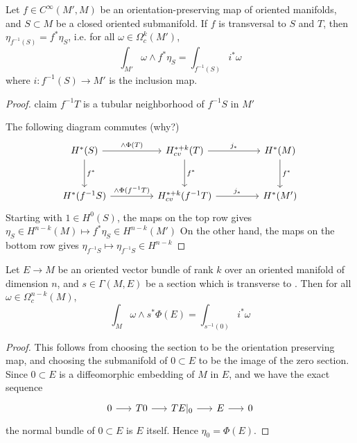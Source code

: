 \begin{thm} %
	Let $f\in C^\infty(M',M)$ be an orientation-preserving map of oriented
	manifolds, and $S\subset M$ be a closed oriented submanifold. 
	If $f$ is transversal to  $S$ and  $T$, then
	$\eta_{f^{-1}(S)} = f^*\eta_S$, i.e. for all  $\omega\in \Omega^k_c(M')$,
	\[
	\int_{M'} \omega \wedge f^*\eta_S =\int_{f^{-1}(S)} i^*\omega  
	\] 
	where $i: f^{-1}(S) \to M'$ is the inclusion map.
\end{thm}
\begin{proof}
	claim $f^{-1}T$ is a tubular neighborhood of $f^{-1}S$ in $M'$

	The following diagram commutes (why?)
	\[\begin{tikzcd}[row sep=2.85em, column sep=4.45em]
			{H^*(S)} & {H^{*+k}_{cv}(T)} & {H^*(M)} \\
				{H^*(f^{-1}S)} & {H^{*+k}_{cv}(f^{-1}T)} & {H^*(M')}
					\arrow["{f^*}", from=1-1, to=2-1]
						\arrow["{f^*}", from=1-2, to=2-2]
							\arrow["{f^*}", from=1-3, to=2-3]
								\arrow["{\wedge \Phi(T)}", from=1-1, to=1-2]
									\arrow["{j_*}", from=1-2, to=1-3]
										\arrow["{j_*}", from=2-2, to=2-3]
											\arrow["{\wedge \Phi(f^{-1}T)}",
											from=2-1, to=2-2]
	\end{tikzcd}\]
	Starting with $1\in H^0(S)$, the maps on the top row gives 
	$\eta_S \in H^{n-k}(M) \mapsto f^*\eta_S \in H^{n-k}(M')$ 
	On the other hand, the maps on the bottom row gives
	$\eta_{f^{-1}S} \mapsto \eta_{f^{-1}S} \in H^{n-k}$
\end{proof}

\begin{cor} \label{cor:vb_localisation} %
	Let $E\to M$ be an oriented vector bundle of rank $k$ over an oriented 
	manifold of dimension $n$, 
	and $s\in\Gamma(M,E)$ be a section which is transverse to .
	Then for all $\omega\in \Omega^{n-k}_c(M)$,
	\[
	\int_M \omega \wedge s^* \Phi(E) =\int_{s^{-1}(0)} i^*\omega  
	\] 
\end{cor}
\begin{proof}
	This follows from choosing the section to be the orientation preserving map, and
	choosing the submanifold of $0\subset E$ to be the image of the zero section.
	Since $0\subset E$ is a diffeomorphic embedding of $M$ in $E$, and we have the
	exact sequence
\[
	\begin{tikzcd}[column sep = 1.6em]
		0 \arrow[r] & T0 \arrow[r] & TE|_0 \arrow[r] 
						& E \arrow[r] & 0
	\end{tikzcd}
	\]
	the normal bundle of  $0\subset E$ is  $E$ itself.
	Hence $\eta_0 = \Phi(E)$. 
\end{proof}


